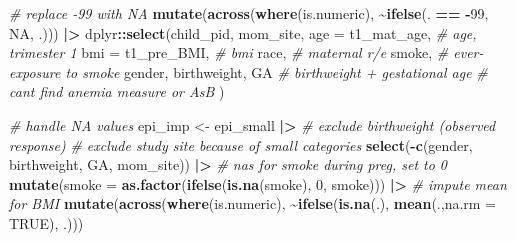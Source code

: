 \documentclass[12pt, twoside]{amherstthesis}
\newenvironment{Shaded}{\begin{snugshade}}{\end{snugshade}}
\newcommand{\AttributeTok}[1]{\textcolor[rgb]{0.13,0.29,0.53}{#1}}
\newcommand{\CommentTok}[1]{\textcolor[rgb]{0.56,0.35,0.01}{\textit{#1}}}
\newcommand{\ConstantTok}[1]{\textcolor[rgb]{0.56,0.35,0.01}{#1}}
\newcommand{\DecValTok}[1]{\textcolor[rgb]{0.00,0.00,0.81}{#1}}
\newcommand{\FunctionTok}[1]{\textcolor[rgb]{0.13,0.29,0.53}{\textbf{#1}}}
\newcommand{\NormalTok}[1]{#1}
\newcommand{\OtherTok}[1]{\textcolor[rgb]{0.56,0.35,0.01}{#1}}
\newcommand{\SpecialCharTok}[1]{\textcolor[rgb]{0.81,0.36,0.00}{\textbf{#1}}}
\begin{document}
\begin{Shaded}
\begin{Highlighting}[]
  \CommentTok{\# replace {-}99 with NA}
  \FunctionTok{mutate}\NormalTok{(}\FunctionTok{across}\NormalTok{(}\FunctionTok{where}\NormalTok{(is.numeric), }\SpecialCharTok{\textasciitilde{}}\FunctionTok{ifelse}\NormalTok{(. }\SpecialCharTok{==} \SpecialCharTok{{-}}\DecValTok{99}\NormalTok{, }\ConstantTok{NA}\NormalTok{, .)))  }\SpecialCharTok{|\textgreater{}} 
\NormalTok{  dplyr}\SpecialCharTok{::}\FunctionTok{select}\NormalTok{(child\_pid, mom\_site, }
                \AttributeTok{age =}\NormalTok{ t1\_mat\_age, }\CommentTok{\# age, trimester 1}
                \AttributeTok{bmi =}\NormalTok{ t1\_pre\_BMI, }\CommentTok{\# bmi}
\NormalTok{                race, }\CommentTok{\# maternal r/e}
\NormalTok{                smoke, }\CommentTok{\# ever{-}exposure to smoke}
\NormalTok{                gender, birthweight, GA }\CommentTok{\# birthweight + gestational age}
                \CommentTok{\# can\textquotesingle{}t find anemia measure or AsB}
\NormalTok{  ) }

\CommentTok{\# handle NA values}
\NormalTok{epi\_imp }\OtherTok{\textless{}{-}}\NormalTok{ epi\_small }\SpecialCharTok{|\textgreater{}} 
  \CommentTok{\# exclude birthweight (observed response)}
  \CommentTok{\# exclude study site because of small categories}
  \FunctionTok{select}\NormalTok{(}\SpecialCharTok{{-}}\FunctionTok{c}\NormalTok{(gender, birthweight, GA, mom\_site)) }\SpecialCharTok{|\textgreater{}} 
  \CommentTok{\# na\textquotesingle{}s for smoke during preg, set to 0}
  \FunctionTok{mutate}\NormalTok{(}\AttributeTok{smoke =} \FunctionTok{as.factor}\NormalTok{(}\FunctionTok{ifelse}\NormalTok{(}\FunctionTok{is.na}\NormalTok{(smoke), }\DecValTok{0}\NormalTok{, smoke))) }\SpecialCharTok{|\textgreater{}} 
  \CommentTok{\# impute mean for BMI}
  \FunctionTok{mutate}\NormalTok{(}\FunctionTok{across}\NormalTok{(}\FunctionTok{where}\NormalTok{(is.numeric), }
                \SpecialCharTok{\textasciitilde{}}\FunctionTok{ifelse}\NormalTok{(}\FunctionTok{is.na}\NormalTok{(.), }\FunctionTok{mean}\NormalTok{(.,}\AttributeTok{na.rm =} \ConstantTok{TRUE}\NormalTok{), .))) }
\end{Highlighting}
\end{Shaded}
\normalsize
\end{document}
